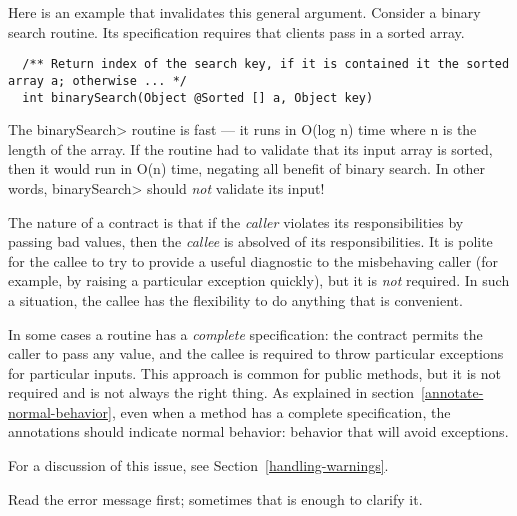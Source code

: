 Here is an example that invalidates this general argument.  Consider a
binary search routine.  Its specification requires that clients pass in a
sorted array.

\begin{smaller}
\begin{Verbatim}
  /** Return index of the search key, if it is contained it the sorted array a; otherwise ... */
  int binarySearch(Object @Sorted [] a, Object key)
\end{Verbatim}
\end{smaller}

The \<binarySearch> routine is fast --- it runs in O(log n) time where n is
the length of the array.  If the routine had to validate that its input
array is sorted, then it would run in O(n) time, negating all benefit of
binary search.  In other words, \<binarySearch> should \emph{not} validate
its input!

The nature of a contract is that if the \emph{caller} violates its
responsibilities by passing bad values, then the \emph{callee} is absolved
of its responsibilities.  It is polite for the callee to try to provide a
useful diagnostic to the misbehaving caller (for example, by raising a
particular exception quickly), but it is \emph{not} required.  In such a
situation, the callee has the flexibility to do anything that is
convenient.

In some cases a routine has a \emph{complete} specification:  the contract
permits the caller to pass any value, and the callee is required to throw
particular exceptions for particular inputs.  This approach is common for
public methods, but it is not required and is not always the right thing.
As explained in section~\ref{annotate-normal-behavior}, even when a method
has a complete specification, the annotations should indicate normal
behavior:  behavior that will avoid exceptions.





For a discussion of this issue, see Section~\ref{handling-warnings}.



Read the error message first; sometimes that is enough to clarify it.


